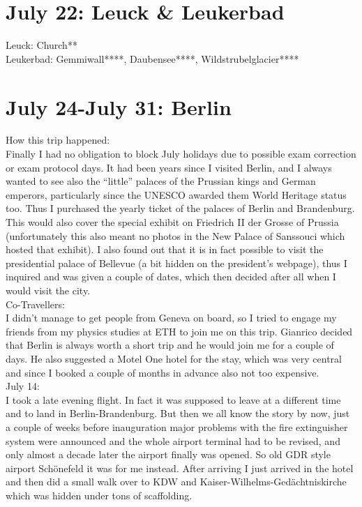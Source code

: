 \section{July 22: Leuck \& Leukerbad}
\label{Leuk2012}

Leuck: Church**\\
Leukerbad: Gemmiwall****, Daubensee****, Wildstrubelglacier****

\section{July 24-July 31: Berlin}
\label{Berlin2012}

How this trip happened:\\
Finally I had no obligation to block July holidays due to possible exam correction or exam protocol days. It had been years since I visited Berlin, and I always wanted to see also the ``little'' palaces of the Prussian kings and German emperors, particularly since the UNESCO awarded them World Heritage status too. Thus I purchased the yearly ticket of the palaces of Berlin and Brandenburg. This would also cover the special exhibit on Friedrich II der Grosse of Prussia (unfortunately this also meant no photos in the New Palace of Sanssouci which hosted that exhibit). I also found out that it is in fact possible to visit the presidential palace of Bellevue (a bit hidden on the president's webpage), thus I inquired and was given a couple of dates, which then decided after all when I would visit the city.\\

Co-Travellers:\\
I didn't manage to get people from Geneva on board, so I tried to engage my friends from my physics studies at ETH to join me on this trip. Gianrico decided that Berlin is always worth a short trip and he would join me for a couple of days. He also suggested a Motel One hotel for the stay, which was very central and since I booked a couple of months in advance also not too expensive.\\

July 14:\\
I took a late evening flight. In fact it was supposed to leave at a different time and to land in Berlin-Brandenburg. But then we all know the story by now, just a couple of weeks before inauguration major problems with the fire extinguisher system were announced and the whole airport terminal had to be revised, and only almost a decade later the airport finally was opened. So old GDR style airport Sch\"onefeld it was for me instead. After arriving I just arrived in the hotel and then did a small walk over to KDW and Kaiser-Wilhelms-Ged\"achtniskirche which was hidden under tons of scaffolding.\\

